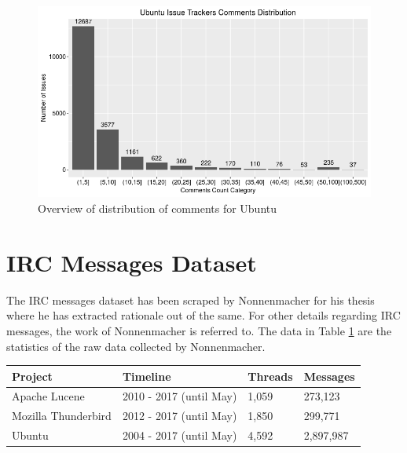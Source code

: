 \documentclass[a4paper,12pt,twoside]{report}
\begin{document}
\begin{figure}[h] %
    \centering
    \includegraphics[width=13cm]{ubuntu-comment-distribution-raw}
    \caption{Overview of distribution of comments for Ubuntu}
    \label{fig:ubuntuRawDistro}
\end{figure}


\section{IRC Messages Dataset}

The \acs{IRC} messages dataset has been scraped by Nonnenmacher \cite{Nonnenmacher2017} for his thesis where he has extracted rationale out of the same. For other details regarding \acs{IRC} messages, the work of Nonnenmacher \cite{Nonnenmacher2017} is referred to. The data in Table \ref{tab:rawIRCMessages} are the statistics of the raw data collected by Nonnenmacher. 

\begin{table} %
    \centering
    \begin{adjustbox}{max width=\columnwidth}
    \def\arraystretch{1} %
    \begin{tabular}{p{4cm} p{5cm} p{2cm} p{3cm}}
        \toprule
        \textbf{Project} & \textbf{Timeline} & \textbf{Threads} & \textbf{Messages}\\
        \midrule
			Apache Lucene & 2010 - 2017 (until May) & 1,059 & 273,123\\
			Mozilla Thunderbird & 2012 - 2017 (until May) & 1,850 & 299,771\\ 
			Ubuntu & 2004 - 2017 (until May) & 4,592 & 2,897,987\\
        \midrule
    \end{tabular}
    \end{adjustbox}
    \label{tab:rawIRCMessages}
\end{table}
\end{document}
